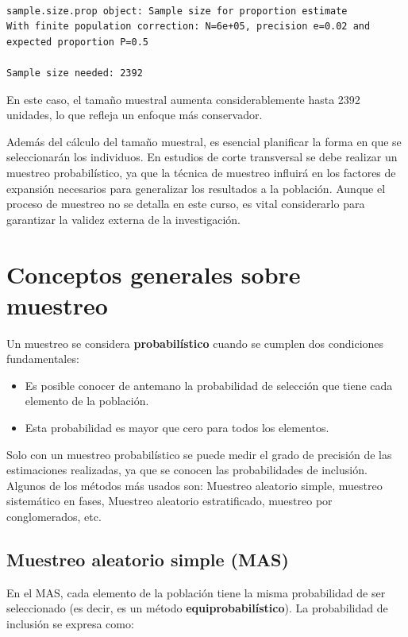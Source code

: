\documentclass[
  spanish,
  a4paper,
]{scrbook}
\begin{document}
\begin{verbatim}

sample.size.prop object: Sample size for proportion estimate
With finite population correction: N=6e+05, precision e=0.02 and expected proportion P=0.5

Sample size needed: 2392
\end{verbatim}

En este caso, el tamaño muestral aumenta considerablemente hasta 2392
unidades, lo que refleja un enfoque más conservador.

Además del cálculo del tamaño muestral, es esencial planificar la forma
en que se seleccionarán los individuos. En estudios de corte transversal
se debe realizar un muestreo probabilístico, ya que la técnica de
muestreo influirá en los factores de expansión necesarios para
generalizar los resultados a la población. Aunque el proceso de muestreo
no se detalla en este curso, es vital considerarlo para garantizar la
validez externa de la investigación.

\section{Conceptos generales sobre
muestreo}\label{conceptos-generales-sobre-muestreo}

Un muestreo se considera \textbf{probabilístico} cuando se cumplen dos
condiciones fundamentales:

\begin{itemize}
\item
  Es posible conocer de antemano la probabilidad de selección que tiene
  cada elemento de la población.
\item
  Esta probabilidad es mayor que cero para todos los elementos.
\end{itemize}

Solo con un muestreo probabilístico se puede medir el grado de precisión
de las estimaciones realizadas, ya que se conocen las probabilidades de
inclusión. Algunos de los métodos más usados son: Muestreo aleatorio
simple, muestreo sistemático en fases, Muestreo aleatorio estratificado,
muestreo por conglomerados, etc.

\subsection{Muestreo aleatorio simple
(MAS)}\label{muestreo-aleatorio-simple-mas}

En el MAS, cada elemento de la población tiene la misma probabilidad de
ser seleccionado (es decir, es un método \textbf{equiprobabilístico}).
La probabilidad de inclusión se expresa como:
\end{document}

